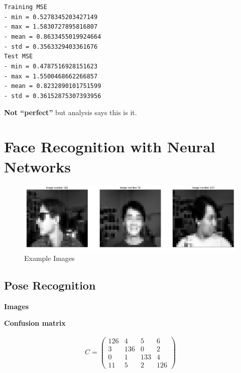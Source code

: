 \documentclass[12pt,a4paper]{article}
\begin{document}
\begin{enumerate}[a)]
\texttt{Training MSE \\
- min = 0.5278345203427149 \\
- max = 1.5830727895816807 \\
- mean = 0.8633455019924664 \\
- std = 0.3563329403361676\\
Test MSE \\
- min = 0.4787516928151623 \\
- max = 1.5500468662266857 \\
- mean = 0.8232890101751599 \\
- std = 0.36152875307393956\\
}

\textbf{Not ``perfect''} but analysis says this is it.

\end{enumerate}

\section{Face Recognition with Neural Networks}

\begin{figure}[H]
	\centering
  \includegraphics[width=\textwidth]{figures/2_images.png}
	\caption{Example Images}
	\label{2_images}
\end{figure}

\subsection{Pose Recognition}

\textbf{Images}

\textbf{Confusion matrix}

\begin{align*}C =
\begin{pmatrix}
126 & 4 & 5 & 6 \\
3 & 136 & 0 & 2 \\
0 & 1 & 133 & 4 \\
11 & 5 & 2 & 126
\end{pmatrix}
\end{align*}
\end{document}
